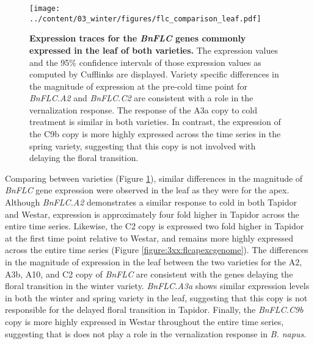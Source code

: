 \documentclass[12pt,]{book}
\begin{document}
\begin{figure}[htbp]
\centering
\texttt{[image: ../content/03\_winter/figures/flc\_comparison\_leaf.pdf]}
\caption{\textbf{Expression traces for the \emph{BnFLC} genes commonly
expressed in the leaf of both varieties.} The expression values and the
95\% confidence intervals of those expression values as computed by
Cufflinks are displayed. Variety specific differences in the magnitude
of expression at the pre-cold time point for \emph{BnFLC.A2} and
\emph{BnFLC.C2} are consistent with a role in the vernalization
response. The response of the A3a copy to cold treatment is similar in
both varieties. In contrast, the expression of the C9b copy is more
highly expressed across the time series in the spring variety,
suggesting that this copy is not involved with delaying the floral
transition.}\label{figure:3xx:flcleafcgenome}
\end{figure}

Comparing between varieties (Figure \ref{figure:3xx:flcleafcgenome}),
similar differences in the magnitude of \emph{BnFLC} gene expression
were observed in the leaf as they were for the apex. Although
\emph{BnFLC.A2} demonstrates a similar response to cold in both Tapidor
and Westar, expression is approximately four fold higher in Tapidor
across the entire time series. Likewise, the C2 copy is expressed two
fold higher in Tapidor at the first time point relative to Westar, and
remains more highly expressed across the entire time series (Figure
\ref{figure:3xx:flcapexcgenome}). The differences in the magnitude of
expression in the leaf between the two varieties for the A2, A3b, A10,
and C2 copy of \emph{BnFLC} are consistent with the genes delaying the
floral transition in the winter variety. \emph{BnFLC.A3a} shows similar
expression levels in both the winter and spring variety in the leaf,
suggesting that this copy is not responsible for the delayed floral
transition in Tapidor. Finally, the \emph{BnFLC.C9b} copy is more highly
expressed in Westar throughout the entire time series, suggesting that
is does not play a role in the vernalization response in \emph{B.
napus}.
\end{document}
